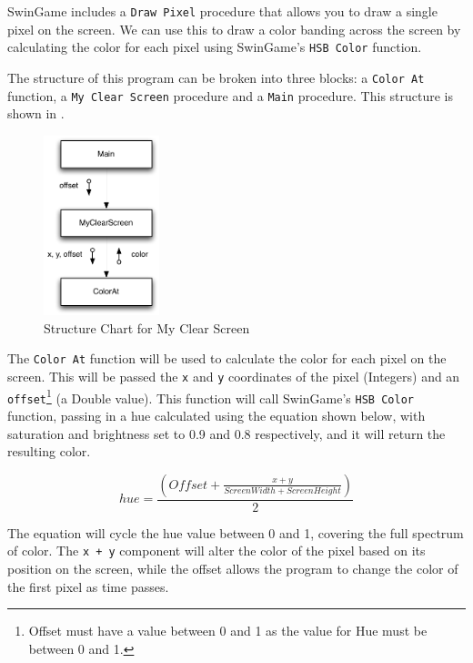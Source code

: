 \begin{enumerate}
  SwinGame includes a \texttt{Draw Pixel} procedure that allows you to draw a single pixel on the screen. We can use this to draw a color banding across the screen by calculating the color for each pixel using SwinGame's \texttt{HSB Color} function.
  
  The structure of this program can be broken into three blocks: a \texttt{Color At} function, a \texttt{My Clear Screen} procedure and a \texttt{Main} procedure. This structure is shown in .

  \begin{figure}[htbp]
     \centering
     \includegraphics[width=0.3\textwidth]{./topics/control-flow/exercises/MyClearScreen.pdf} 
     \caption{Structure Chart for My Clear Screen}
     \label{fig:my_clear_screen}
  \end{figure}

\clearpage

The \texttt{Color At} function will be used to calculate the color for each pixel on the screen. This will be passed the \texttt{x} and \texttt{y} coordinates of the pixel (Integers) and an \texttt{offset}\footnote{Offset must have a value between 0 and 1 as the value for Hue must be between 0 and 1.} (a Double value). This function will call SwinGame's \texttt{HSB Color} function, passing in a hue calculated using the equation shown below, with saturation and brightness set to 0.9 and 0.8 respectively, and it will return the resulting color.

\begin{equation}
  hue = \frac{\displaystyle (Offset + \frac{x + y}{Screen Width + Screen Height})}{2}
\end{equation}

The equation will cycle the hue value between 0 and 1, covering the full spectrum of color. The \texttt{x + y} component will alter the color of the pixel based on its position on the screen, while the offset allows the program to change the color of the first pixel as time passes.


\end{enumerate}
